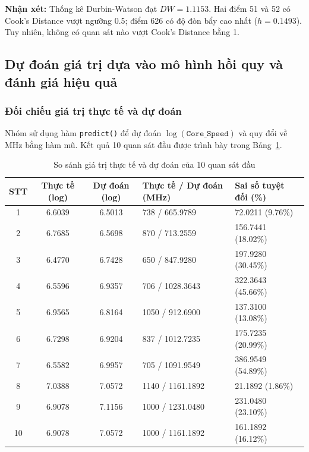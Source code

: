 \textbf{Nhận xét:} Thống kê Durbin-Watson đạt $DW=1.1153$. Hai điểm 51 và 52 có Cook's Distance vượt ngưỡng 0.5; điểm 626 có độ đòn bẩy cao nhất ($h=0.1493$). Tuy nhiên, không có quan sát nào vượt Cook's Distance bằng 1.

\subsection{Dự đoán giá trị dựa vào mô hình hồi quy và đánh giá hiệu quả}

\subsubsection{Đối chiếu giá trị thực tế và dự đoán}

Nhóm sử dụng hàm \texttt{predict()} để dự đoán $\log(\texttt{Core\_Speed})$ và quy đổi về MHz bằng hàm mũ. Kết quả 10 quan sát đầu được trình bày trong Bảng~\ref{tab:du-doan-10-dong}.

\begin{table}[H]
\centering
\scriptsize
\renewcommand{\arraystretch}{1.1}
\setlength{\tabcolsep}{3pt}
\caption{So sánh giá trị thực tế và dự đoán của 10 quan sát đầu}
\label{tab:du-doan-10-dong}
\begin{tabularx}{\textwidth}{@{}c c c X X@{}}
\toprule
\textbf{STT} & \textbf{Thực tế (log)} & \textbf{Dự đoán (log)} & \textbf{Thực tế / Dự đoán (MHz)} & \textbf{Sai số tuyệt đối (\%)} \\
\midrule
1 & 6.6039 & 6.5013 & 738 / 665.9789 & 72.0211 (9.76\%) \\
2 & 6.7685 & 6.5698 & 870 / 713.2559 & 156.7441 (18.02\%) \\
3 & 6.4770 & 6.7428 & 650 / 847.9280 & 197.9280 (30.45\%) \\
4 & 6.5596 & 6.9357 & 706 / 1028.3643 & 322.3643 (45.66\%) \\
5 & 6.9565 & 6.8164 & 1050 / 912.6900 & 137.3100 (13.08\%) \\
6 & 6.7298 & 6.9204 & 837 / 1012.7235 & 175.7235 (20.99\%) \\
7 & 6.5582 & 6.9957 & 705 / 1091.9549 & 386.9549 (54.89\%) \\
8 & 7.0388 & 7.0572 & 1140 / 1161.1892 & 21.1892 (1.86\%) \\
9 & 6.9078 & 7.1156 & 1000 / 1231.0480 & 231.0480 (23.10\%) \\
10 & 6.9078 & 7.0572 & 1000 / 1161.1892 & 161.1892 (16.12\%) \\
\bottomrule
\end{tabularx}
\end{table}

